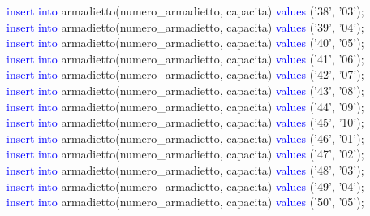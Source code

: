 \documentclass{article}
\begin{document}
\begin{flushleft}
{        \hspace*{0.5em}\textcolor{blue}{insert into} armadietto(numero\_armadietto, capacita) \textcolor{blue}{values} ('38', '03'); \\
        \hspace*{0.5em}\textcolor{blue}{insert into} armadietto(numero\_armadietto, capacita) \textcolor{blue}{values} ('39', '04'); \\
        \hspace*{0.5em}\textcolor{blue}{insert into} armadietto(numero\_armadietto, capacita) \textcolor{blue}{values} ('40', '05'); \\
        \hspace*{0.5em}\textcolor{blue}{insert into} armadietto(numero\_armadietto, capacita) \textcolor{blue}{values} ('41', '06'); \\
        \hspace*{0.5em}\textcolor{blue}{insert into} armadietto(numero\_armadietto, capacita) \textcolor{blue}{values} ('42', '07'); \\
        \hspace*{0.5em}\textcolor{blue}{insert into} armadietto(numero\_armadietto, capacita) \textcolor{blue}{values} ('43', '08'); \\
        \hspace*{0.5em}\textcolor{blue}{insert into} armadietto(numero\_armadietto, capacita) \textcolor{blue}{values} ('44', '09'); \\
        \hspace*{0.5em}\textcolor{blue}{insert into} armadietto(numero\_armadietto, capacita) \textcolor{blue}{values} ('45', '10'); \\
        \hspace*{0.5em}\textcolor{blue}{insert into} armadietto(numero\_armadietto, capacita) \textcolor{blue}{values} ('46', '01'); \\
        \hspace*{0.5em}\textcolor{blue}{insert into} armadietto(numero\_armadietto, capacita) \textcolor{blue}{values} ('47', '02'); \\
        \hspace*{0.5em}\textcolor{blue}{insert into} armadietto(numero\_armadietto, capacita) \textcolor{blue}{values} ('48', '03'); \\
        \hspace*{0.5em}\textcolor{blue}{insert into} armadietto(numero\_armadietto, capacita) \textcolor{blue}{values} ('49', '04'); \\
        \hspace*{0.5em}\textcolor{blue}{insert into} armadietto(numero\_armadietto, capacita) \textcolor{blue}{values} ('50', '05'); \\}
    \end{flushleft}
\end{document}
